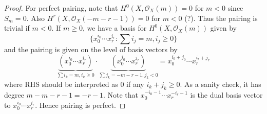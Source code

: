 \documentclass[a4paper]{article}
\newcommand{\sh}[1]{\mathcal{#1}} %
\begin{document}
\begin{proof}
  For perfect pairing, note that \(H^0(X, \sh O_X(m)) = 0\) for \(m < 0\) since \(S_m = 0\). Also \(H^r(X, \sh O_X(-m - r - 1)) = 0\) for \(m < 0\) (?). Thus the pairing is trivial if \(m < 0\). If \(m \geq 0\), we have a basis for \(H^0(X, \sh O_X(m))\) given by
  \[
    \{x_0^{i_0} \cdots x_r^{i_r}: \sum i_j = m, i_j \geq 0\}
  \]
  and the pairing is given on the level of basis vectors by
  \[
    \underbrace{(x_0^{i_0} \cdots x_r^{i_r})}_{\sum i_k = m, i_k \geq 0} \cdot
    \underbrace{(x_0^{j_0} \cdots x_r^{j_r})}_{\sum j_k = -m - r - 1, j_k < 0}
    = x_0^{i_0 + j_0} \cdots x_r^{i_r + j_r}
  \]
  where RHS should be interpreted as \(0\) if any \(i_k + j_k \geq 0\). As a sanity check, it has degree \(m - m -r - 1 = -r - 1\). Note that \(x_0^{-i_0 - 1} \cdots x_r^{-i_r - 1}\) is the dual basis vector to \(x_0^{i_0} \cdots x_r^{i_r}\). Hence pairing is perfect.


\end{proof}
\end{document}
